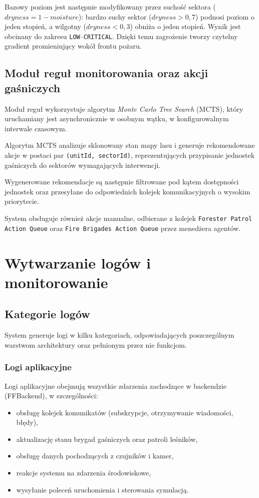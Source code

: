 Bazowy poziom jest następnie modyfikowany przez suchość sektora ($\mathit{dryness} = 1 - \mathit{moisture}$): bardzo suchy sektor ($\mathit{dryness} > 0{,}7$) podnosi poziom o jeden stopień, a wilgotny ($\mathit{dryness} < 0{,}3$) obniża o jeden stopień. Wynik jest obcinany do zakresu \texttt{LOW}--\texttt{CRITICAL}. Dzięki temu zagrożenie tworzy czytelny gradient promieniujący wokół frontu pożaru.

\subsection{Moduł reguł monitorowania oraz akcji gaśniczych}

Moduł reguł wykorzystuje algorytm \textit{Monte Carlo Tree Search} (MCTS), który uruchamiany jest asynchronicznie w osobnym wątku, w konfigurowalnym interwale czasowym.

Algorytm MCTS analizuje sklonowany stan mapy lasu i generuje rekomendowane akcje w postaci par \texttt{(unitId, sectorId)}, reprezentujących przypisanie jednostek gaśniczych do sektorów wymagających interwencji.

Wygenerowane rekomendacje są następnie filtrowane pod kątem dostępności jednostek oraz przesyłane do odpowiednich kolejek komunikacyjnych o wysokim priorytecie.

System obsługuje również akcje manualne, odbierane z kolejek \texttt{Forester Patrol Action Queue} oraz \texttt{Fire Brigades Action Queue} przez menedżera agentów.

\section{Wytwarzanie logów i monitorowanie}

\subsection{Kategorie logów}

System generuje logi w kilku kategoriach, odpowiadających poszczególnym warstwom architektury oraz pełnionym przez nie funkcjom.

\subsubsection*{Logi aplikacyjne}

Logi aplikacyjne obejmują wszystkie zdarzenia zachodzące w backendzie (FFBackend), w szczególności:
\begin{itemize}
    \item obsługę kolejek komunikatów (subskrypcje, otrzymywanie wiadomości, błędy),
    \item aktualizację stanu brygad gaśniczych oraz patroli leśników,
    \item obsługę danych pochodzących z czujników i kamer,
    \item reakcje systemu na zdarzenia środowiskowe,
    \item wysyłanie poleceń uruchomienia i sterowania symulacją.
\end{itemize}


